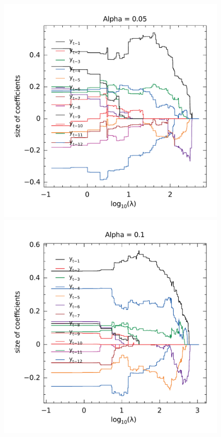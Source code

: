 \begin{figure}
	\centering
	\begin{minipage}[t]{0.4\linewidth}
		\centering
		\begin{minipage}[t]{\linewidth}
			\centering     \includegraphics[width=\textwidth]{Figuras/selecao-lasso/par-sellasso-005.pdf}
		\end{minipage}
		\begin{minipage}[b]{\linewidth}
			\centering     \includegraphics[width=\textwidth]{Figuras/selecao-lasso/par-sellasso-01.pdf}

\end{minipage}
\end{minipage}
\end{figure}
